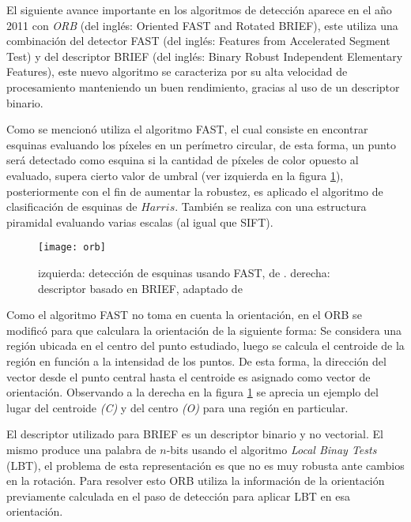 El siguiente avance importante en los algoritmos de detección aparece en el año 2011 con \textit{ORB} \cite{orb} (del inglés: Oriented FAST and Rotated BRIEF), este utiliza una combinación del detector FAST (del inglés: Features from Accelerated Segment Test) y del descriptor BRIEF (del inglés: Binary Robust Independent Elementary Features), este nuevo algoritmo se caracteriza por su alta velocidad de procesamiento manteniendo un buen rendimiento, gracias al uso de un descriptor binario. 

Como se mencionó utiliza el algoritmo FAST, el cual consiste en encontrar esquinas evaluando los píxeles en un perímetro circular, de esta forma, un punto será detectado como esquina si la cantidad de píxeles de color opuesto al evaluado, supera cierto valor de umbral (ver izquierda en la figura \ref{imagen:orb}), posteriormente con el fin de aumentar la robustez, es aplicado el algoritmo de clasificación de esquinas de $Harris$. También se realiza con una estructura piramidal evaluando varias escalas (al igual que SIFT).

\begin{figure}[H]
	\centering
	\texttt{[image: orb]}
	\caption[Detector y descriptor ORB]{izquierda: detección de esquinas usando FAST, de \cite{fast}. derecha: descriptor basado en BRIEF, adaptado de\protect\footnotemark }
	\label{imagen:orb}
\end{figure}

Como el algoritmo FAST no toma en cuenta la orientación, en el ORB se modificó para que calculara la orientación de la siguiente forma: Se considera una región ubicada en el centro del punto estudiado, luego se calcula el centroide de la región en función a la intensidad de los puntos. De esta forma, la dirección del vector desde el punto central  hasta el centroide es asignado como vector de orientación. Observando a la derecha en la figura \ref{imagen:orb} se aprecia un ejemplo del lugar del centroide \textit{(C)} y del centro \textit{(O)} para una región en particular.

El descriptor utilizado para BRIEF es un descriptor binario y no vectorial. El mismo produce una palabra de $n$-bits usando el algoritmo \textit{Local Binay Tests} (LBT), el problema de esta representación es que no es muy robusta ante cambios en la rotación. Para resolver esto ORB utiliza la información de la orientación previamente calculada en el paso de detección para aplicar LBT en esa orientación.

